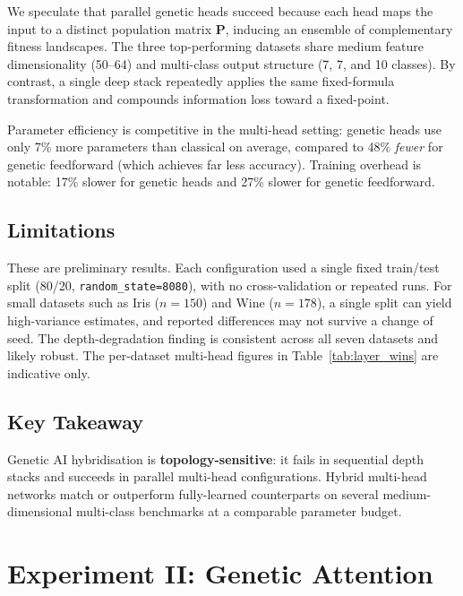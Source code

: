 \documentclass[10pt, a4paper, twocolumn]{article}
\begin{document}
We speculate that parallel genetic heads succeed because each head maps the input to a distinct population matrix $\mathbf{P}$, inducing an ensemble of complementary fitness landscapes. The three top-performing datasets share medium feature dimensionality (50--64) and multi-class output structure (7, 7, and 10 classes). By contrast, a single deep stack repeatedly applies the same fixed-formula transformation and compounds information loss toward a fixed-point.

Parameter efficiency is competitive in the multi-head setting: genetic heads use only 7\% more parameters than classical on average, compared to 48\% \emph{fewer} for genetic feedforward (which achieves far less accuracy). Training overhead is notable: 17\% slower for genetic heads and 27\% slower for genetic feedforward.

\subsection*{Limitations}

These are preliminary results. Each configuration used a single fixed train/test split (80/20, \texttt{random\_state=8080}), with no cross-validation or repeated runs. For small datasets such as Iris ($n{=}150$) and Wine ($n{=}178$), a single split can yield high-variance estimates, and reported differences may not survive a change of seed. The depth-degradation finding is consistent across all seven datasets and likely robust. The per-dataset multi-head figures in Table~\ref{tab:layer_wins} are indicative only.

\subsection*{Key Takeaway}

\begin{tcolorbox}[resultbox]
  \small Genetic AI hybridisation is \textbf{topology-sensitive}: it fails in sequential depth stacks and succeeds in parallel multi-head configurations. Hybrid multi-head networks match or outperform fully-learned counterparts on several medium-dimensional multi-class benchmarks at a comparable parameter budget.
\end{tcolorbox}

\section{Experiment II: Genetic Attention}
\label{sec:attention}
\end{document}
